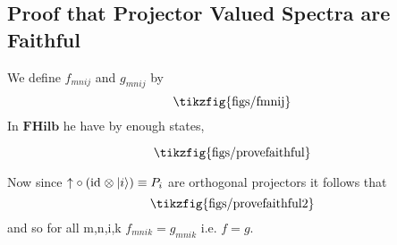 \documentclass[submission,copyright,creativecommons,sharealike,noncommercial]{eptcs}
\newcommand{\tikzfigscale}[2]{\scalebox{#1}{\tikzfig{#2}}}
\newcommand{\id}[1]{\textrm{id}_{#1}}
\newcommand{\putt}[1]{\mathbin{\uparrow_{#1}}}
\theoremstyle{definition}
\theoremstyle{plain}
\theoremstyle{plain}
\begin{document}
\subsection{Proof that Projector Valued Spectra are Faithful} \label{faithfulproj}

We define $f_{mnij}$ and $g_{mnij}$ by 
\begin{equation}
    \tikzfigscale{1}{figs/fmnij}
\end{equation}
In $\mathbf{FHilb}$ he have by enough states,

\begin{equation}
    \tikzfigscale{1}{figs/provefaithful}
\end{equation}

Now since $\putt{} \circ (\id{} \otimes \ket{i}) \equiv P_{i}$ are orthogonal projectors it follows that 
\begin{equation}
    \tikzfigscale{1}{figs/provefaithful2}
\end{equation}
and so for all m,n,i,k $f_{mnik} = g_{mnik}$ i.e. $f=g$.
\end{document}
